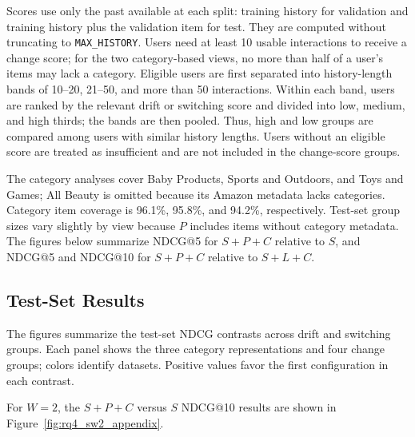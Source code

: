 ﻿\documentclass[sigconf,anonymous,review]{acmart}
\begin{document}
Scores use only the past available at each split: training history for validation and training history plus the validation item for test. They are computed without truncating to \texttt{MAX\_HISTORY}. Users need at least 10 usable interactions to receive a change score; for the two category-based views, no more than half of a user's items may lack a category. Eligible users are first separated into history-length bands of 10--20, 21--50, and more than 50 interactions. Within each band, users are ranked by the relevant drift or switching score and divided into low, medium, and high thirds; the bands are then pooled. Thus, high and low groups are compared among users with similar history lengths. Users without an eligible score are treated as insufficient and are not included in the change-score groups.

The category analyses cover Baby Products, Sports and Outdoors, and Toys and Games; All Beauty is omitted because its Amazon metadata lacks categories. Category item coverage is 96.1\%, 95.8\%, and 94.2\%, respectively. Test-set group sizes vary slightly by view because $P$ includes items without category metadata. The figures below summarize NDCG@5 for $S+P+C$ relative to $S$, and NDCG@5 and NDCG@10 for $S+P+C$ relative to $S+L+C$.

\subsection{Test-Set Results}
\label{app:pref_change_full_results}
The figures summarize the test-set NDCG contrasts across drift and switching groups. Each panel shows the three category representations and four change groups; colors identify datasets. Positive values favor the first configuration in each contrast.

For $W=2$, the $S+P+C$ versus $S$ NDCG@10 results are shown in Figure~\ref{fig:rq4_sw2_appendix}.
\end{document}
